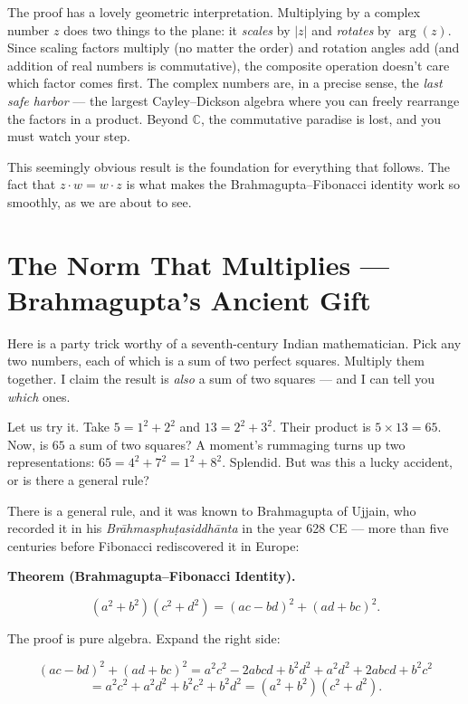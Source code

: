 \documentclass[11pt,openright,twoside]{book}
\theoremstyle{definition}
\begin{document}
The proof has a lovely geometric interpretation. Multiplying by a complex number $z$ does two things to the plane: it \textit{scales} by $|z|$ and \textit{rotates} by $\arg(z)$. Since scaling factors multiply (no matter the order) and rotation angles add (and addition of real numbers is commutative), the composite operation doesn't care which factor comes first. The complex numbers are, in a precise sense, the \textit{last safe harbor} --- the largest Cayley--Dickson algebra where you can freely rearrange the factors in a product. Beyond $\mathbb{C}$, the commutative paradise is lost, and you must watch your step.

This seemingly obvious result is the foundation for everything that follows. The fact that $z \cdot w = w \cdot z$ is what makes the Brahmagupta--Fibonacci identity work so smoothly, as we are about to see.


\bigskip


\section{The Norm That Multiplies — Brahmagupta's Ancient Gift}

Here is a party trick worthy of a seventh-century Indian mathematician. Pick any two numbers, each of which is a sum of two perfect squares. Multiply them together. I claim the result is \textit{also} a sum of two squares --- and I can tell you \textit{which} ones.

Let us try it. Take $5 = 1^2 + 2^2$ and $13 = 2^2 + 3^2$. Their product is $5 \times 13 = 65$. Now, is $65$ a sum of two squares? A moment's rummaging turns up two representations: $65 = 4^2 + 7^2 = 1^2 + 8^2$. Splendid. But was this a lucky accident, or is there a general rule?

There is a general rule, and it was known to Brahmagupta of Ujjain, who recorded it in his \textit{Brāhmasphuṭasiddhānta} in the year 628 CE --- more than five centuries before Fibonacci rediscovered it in Europe:

\textbf{Theorem (Brahmagupta--Fibonacci Identity).}

\[(a^2 + b^2)(c^2 + d^2) = (ac - bd)^2 + (ad + bc)^2.\]

The proof is pure algebra. Expand the right side:

\[(ac - bd)^2 + (ad + bc)^2 = a^2c^2 - 2abcd + b^2d^2 + a^2d^2 + 2abcd + b^2c^2\]
\[= a^2c^2 + a^2d^2 + b^2c^2 + b^2d^2 = (a^2 + b^2)(c^2 + d^2).\]
\end{document}
